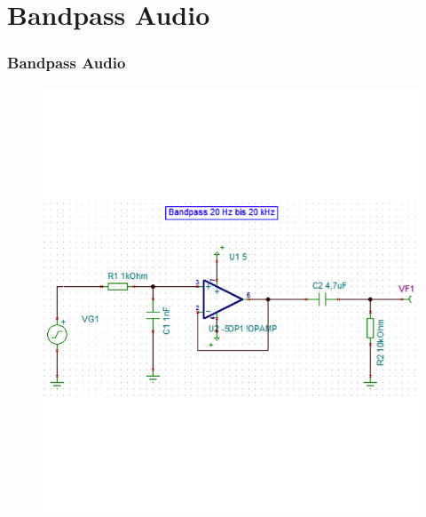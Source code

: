 \section{Bandpass Audio}
\begin{frame}
    \frametitle{Bandpass Audio}
    \begin{figure}
        \begin{minipage}{0.45\textwidth}
            \includegraphics[width=\textwidth]{fig/Bandpass_20Hz-20kHz_Schema.png}
        \end{minipage}
        \begin{minipage}{0.45\textwidth}

\end{minipage}
\end{figure}
\end{frame}
